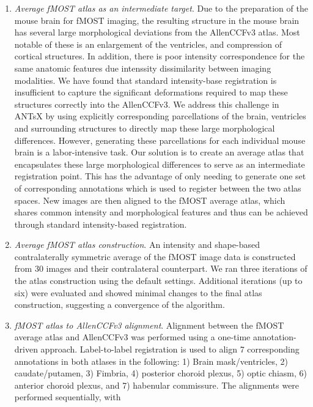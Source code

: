 \documentclass[
  12pt,
]{article}
\begin{document}
\begin{enumerate}
\def\labelenumi{\arabic{enumi}.}
\item
  \emph{Average fMOST atlas as an intermediate target}. Due to the
  preparation of the mouse brain for fMOST imaging, the resulting
  structure in the mouse brain has several large morphological
  deviations from the AllenCCFv3 atlas. Most notable of these is an
  enlargement of the ventricles, and compression of cortical structures.
  In addition, there is poor intensity correspondence for the same
  anatomic features due intenssity dissimilarity between imaging
  modalities. We have found that standard intensity-base registration is
  insufficient to capture the significant deformations required to map
  these structures correctly into the AllenCCFv3. We address this
  challenge in ANTsX by using explicitly corresponding parcellations of
  the brain, ventricles and surrounding structures to directly map these
  large morphological differences. However, generating these
  parcellations for each individual mouse brain is a labor-intensive
  task. Our solution is to create an average atlas that encapsulates
  these large morphological differences to serve as an intermediate
  registration point. This has the advantage of only needing to generate
  one set of corresponding annotations which is used to register between
  the two atlas spaces. New images are then aligned to the fMOST average
  atlas, which shares common intensity and morphological features and
  thus can be achieved through standard intensity-based registration.
\item
  \emph{Average fMOST atlas construction}. An intensity and shape-based
  contralaterally symmetric average of the fMOST image data is
  constructed from 30 images and their contralateral counterpart. We ran
  three iterations of the atlas construction using the default settings.
  Additional iterations (up to six) were evaluated and showed minimal
  changes to the final atlas construction, suggesting a convergence of
  the algorithm.
\item
  \emph{fMOST atlas to AllenCCFv3 alignment}. Alignment between the
  fMOST average atlas and AllenCCFv3 was performed using a one-time
  annotation-driven approach. Label-to-label registration is used to
  align 7 corresponding annotations in both atlases in the following: 1)
  Brain mask/ventricles, 2) caudate/putamen, 3) Fimbria, 4) posterior
  choroid plexus, 5) optic chiasm, 6) anterior choroid plexus, and 7)
  habenular commissure. The alignments were performed sequentially, with

\end{enumerate}
\end{document}
